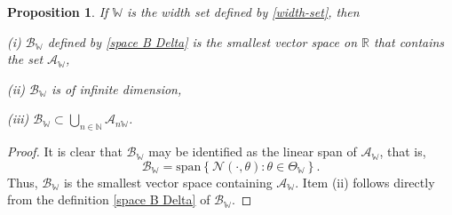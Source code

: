 \documentclass[11pt]{article}
\newtheorem{proposition}[theorem]{Proposition}
\begin{document}
\begin{proposition}\label{prop: BM is a linear space}
If $\mathbb{W}$ is the width set defined by \eqref{width-set}, then 

(i) $\mathcal{B}_{\mathbb{W}}$ defined by \eqref{space B Delta} is the smallest vector space on $\mathbb{R}$ that contains the set $\mathcal{A}_{\mathbb{W}}$, 

(ii) $\mathcal{B}_{\mathbb{W}}$ is of infinite dimension,

(iii) $\mathcal{B}_{\mathbb{W}}\subset\bigcup_{n\in\mathbb{N}}\mathcal{A}_{n\mathbb{W}}$. 
\end{proposition}
\begin{proof}
It is clear that $\mathcal{B}_{\mathbb{W}}$ may be identified as the linear span of $\mathcal{A}_{\mathbb{W}}$, that is, 
$$
\mathcal{B}_{\mathbb{W}}=\text{span} \left\{\mathcal{N}(\cdot,\theta): \theta\in \Theta_{\mathbb{W}}\right\}.
$$
Thus, $\mathcal{B}_{\mathbb{W}}$ is the smallest vector space containing $\mathcal{A}_{\mathbb{W}}$. Item (ii) follows directly from the definition \eqref{space B Delta} of $\mathcal{B}_{\mathbb{W}}$.


\end{proof}
\end{document}
